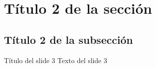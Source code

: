 \section{Título 2 de la sección}

\subsection{Título 2 de la subsección}
\begin{frame}{Título del slide 3}
	Texto del slide 3
\end{frame}
